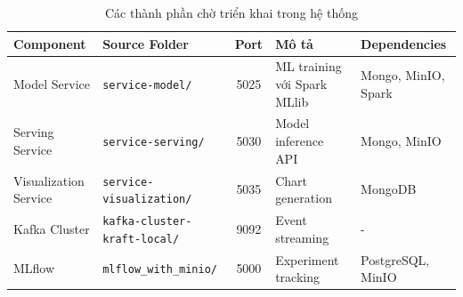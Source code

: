 \begin{table}[H]
    \centering
    \small %
    \renewcommand{\arraystretch}{1.3} %
    

    \begin{tabularx}{\textwidth}{@{} l l c Y Y @{}}
        \toprule
        \textbf{Component} & \textbf{Source Folder} & \textbf{Port} & \textbf{Mô tả} & \textbf{Dependencies} \\
        \midrule
        
        Model Service & \texttt{service-model/} & 5025 & ML training với Spark MLlib & Mongo, MinIO, Spark \\
        
        Serving Service & \texttt{service-serving/} & 5030 & Model inference API & Mongo, MinIO \\
        
        Visualization Service & \texttt{service-visualization/} & 5035 & Chart generation & MongoDB \\
        
        Kafka Cluster & \texttt{kafka-cluster-kraft-local/} & 9092 & Event streaming & - \\
        
        MLflow & \texttt{mlflow\_with\_minio/} & 5000 & Experiment tracking & PostgreSQL, MinIO \\
        \bottomrule
    \end{tabularx}
    \caption{Các thành phần chờ triển khai trong hệ thống}
    \label{tab:undeployed}
\end{table}




